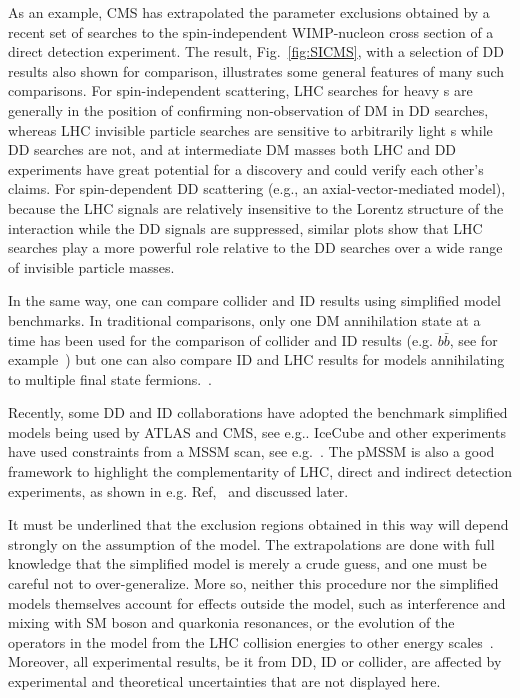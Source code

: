 As an example, CMS has extrapolated the parameter exclusions obtained by a recent set of searches to the spin-independent WIMP-nucleon cross section of a direct detection experiment.
The result, Fig.~\ref{fig:SICMS}, with a selection of DD results also shown for comparison, illustrates some general features of many such comparisons.
For spin-independent scattering, LHC searches for heavy {\IP}s are generally in the position of confirming non-observation of DM in DD searches, whereas LHC invisible particle searches are sensitive to arbitrarily light {\IP}s while DD searches are not, and at intermediate DM masses both LHC and DD experiments have great potential for a discovery and could verify each other's claims.
For spin-dependent DD scattering (e.g., an axial-vector-mediated model), because the LHC signals are relatively insensitive to the Lorentz structure of the interaction while the DD signals are suppressed, similar plots show that LHC searches play a more powerful role relative to the DD searches over a wide range of invisible particle masses. 

In the same way, one can compare collider and ID results using simplified model benchmarks. In traditional comparisons, only one DM annihilation state at a time has been used for the comparison of collider and ID results (e.g. $b\bar{b}$, see for example~\cite{Agrawal:2014una}) but one can also compare ID and LHC results for models annihilating to multiple final state fermions.~\cite{Carpenter:2016thc}.

Recently, some DD and ID collaborations have adopted the benchmark simplified models being used by ATLAS and CMS, see e.g.\cite{PhysRevLett.118.251301,Balazs:2017hxh}.
IceCube and other experiments have used constraints from a MSSM scan, see e.g.~\cite{Aartsen:2016zhm}. The pMSSM is also a good framework to highlight the complementarity of LHC, direct and indirect detection experiments, as shown in e.g. Ref,~\cite{Cahill-Rowley:2014twa} and discussed later. %

\begin{marginnote}[]
\end{marginnote}

It must be underlined that the exclusion regions obtained in this way will depend strongly on the assumption of the model.
The extrapolations are done with full knowledge that the simplified model is merely a crude guess, and one must be careful not to over-generalize.
More so, neither this procedure nor the simplified models themselves account for effects outside the model, such as interference and mixing with SM boson and quarkonia resonances, or the evolution of the operators in the model from the LHC collision energies to other energy scales~\cite{DEramo:2014nmf}.
Moreover, all experimental results, be it from DD, ID or collider, are affected by experimental and theoretical uncertainties that are not displayed here.


